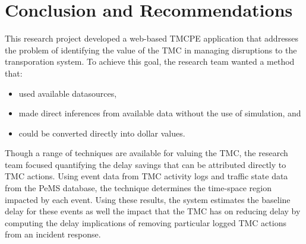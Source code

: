 \documentclass[12pt]{report}
\newcounter{time}
\newcounter{space}
\begin{document}







\chapter{Conclusion and Recommendations}
\label{chap:conclusion}

This research project developed a web-based \ac{TMCPE} application that
addresses the problem of identifying the value of the \ac{TMC} in managing
disruptions to the transporation system.  To achieve this goal, the research
team wanted a method that:
\begin{itemize}
\item used available datasources,
\item made direct inferences from available data without the use of simulation,
  and
\item could be converted directly into dollar values.
\end{itemize}

Though a range of techniques are available for valuing the \ac{TMC}, the
research team focused quantifying the delay savings that can be attributed
directly to \ac{TMC} actions.  Using event data from \ac{TMC} activity logs and
traffic state data from the \ac{PeMS} database, the technique determines the
time-space region impacted by each event.  Using these results, the system
estimates the baseline delay for these events as well the impact that the
\ac{TMC} has on reducing delay by computing the delay implications of removing
particular logged \ac{TMC} actions from an incident response.
\end{document}
